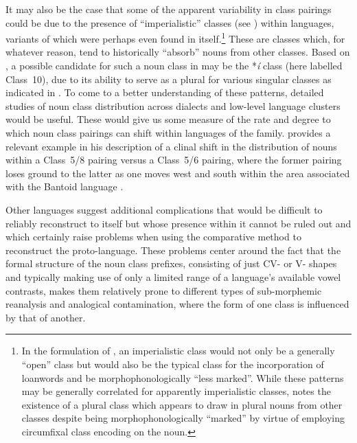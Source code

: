 \documentclass[output=paper ,collection	  ,collectionchapter ,biblatexbackend=biber   ]{langscibook}
\begin{document}
It may also be the case that some of the apparent variability in class pairings
could be due to the presence of ``imperialistic'' classes (see
) within  languages, variants
of which were perhaps even found in  itself.{\footnote{In the
formulation of , an imperialistic class would not
only be a generally ``open'' class but would also be the typical class for the
incorporation of loanwords and be morphophonologically ``less marked''. While
these patterns may be generally correlated for apparently imperialistic classes,
 notes the existence of a plural class which
appears to draw in plural nouns from other classes despite being
morphophonologically ``marked'' by virtue of employing circumfixal class
encoding on the noun.}} These are classes which, for whatever reason, tend to
historically ``absorb'' nouns from other classes. Based on
, a possible candidate for such a noun class in
 may be the *\emph{í} class (here labelled Class~10), due to
its ability to serve as a plural for various singular classes as indicated in
. To come to a better understanding of these patterns, detailed
studies of noun class distribution across dialects and low-level language
clusters would be useful. These would give us some measure of the rate and
degree to which noun class pairings can shift within languages of the family.
 provides a relevant example in his description
of a clinal shift in the distribution of nouns within a Class~5/8 pairing versus
a Class~5/6 pairing, where the former pairing loses ground to the latter as one
moves west and south within the area associated with the Bantoid language
.

Other languages suggest additional complications that would be difficult to
reliably reconstruct to  itself but whose presence within it
cannot be ruled out and which certainly raise problems when using the
comparative method to reconstruct the proto-language. These problems center
around the fact that the formal structure of the  noun class
prefixes, consisting of just CV- or V- shapes and typically making use of only a
limited range of a language's available vowel contrasts, makes them relatively
prone to different types of sub-morphemic reanalysis and analogical
contamination, where the form of one class is influenced by that of another.
\end{document}
